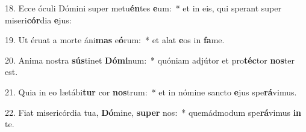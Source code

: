 18. Ecce óculi Dómini super metu\textbf{én}tes \textbf{e}um:~*  et in eis, qui sperant super miseri\textbf{cór}dia \textbf{e}jus:\

19. Ut éruat a morte áni\textbf{mas} e\textbf{ó}rum:~*  et alat \textbf{e}os in \textbf{fa}me.\

20. Anima nostra \textbf{sús}tinet \textbf{Dó}\textbf{mi}num:~*  quóniam adjútor et pro\textbf{téc}tor \textbf{nos}ter est.\

21. Quia in eo lætábi\textbf{tur} cor \textbf{nos}trum:~*  et in nómine sancto \textbf{e}jus spe\textbf{rá}vimus.\

22. Fiat misericórdia tua, \textbf{Dó}mine, \textbf{su}\textbf{per} nos:~*  quemádmodum spe\textbf{rá}vimus \textbf{in} te.\


